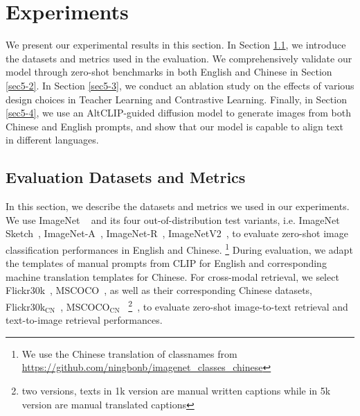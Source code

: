 \section{Experiments}
\label{sec5}
We present our experimental results in this section. In Section \ref{sec5-1}, we introduce the datasets and metrics used in the evaluation. We comprehensively validate our model through zero-shot benchmarks in both English and Chinese in Section \ref{sec5-2}.
In Section \ref{sec5-3}, we conduct an ablation study on the effects of various design choices in Teacher Learning and Contrastive Learning. 
Finally, in Section \ref{sec5-4}, we use an AltCLIP-guided diffusion model to generate images from both Chinese and English prompts, and show that our model is capable to align text in different languages.


\subsection{Evaluation Datasets and Metrics} 
\label{sec5-1}
In this section, we describe the datasets and metrics we used in our experiments. We use ImageNet ~\cite{deng2009imagenet} and its four out-of-distribution test variants, i.e. ImageNet Sketch~\cite{wang2019learning}, ImageNet-A~\cite{hendrycks2021natural}, ImageNet-R~\cite{hendrycks2021many}, ImageNetV2~\cite{recht2019imagenet}, to evaluate zero-shot image classification performances in English and Chinese. \footnote{We use the Chinese translation of classnames from \url{https://github.com/ningbonb/imagenet_classes_chinese}}
During evaluation, we adapt the templates of manual prompts from CLIP for English and corresponding machine translation templates for Chinese. For cross-modal retrieval, we select Flickr30k~\cite{young2014image}, MSCOCO~\cite{lin2014microsoft}, as well as their corresponding Chinese datasets, Flickr30k$_\text{CN}$~\cite{lan2017fluency}, MSCOCO$_\text{CN}$~ \footnote{two versions, texts in 1k version are manual written captions while in 5k version are manual translated captions}~\cite{li2019coco}, to evaluate zero-shot image-to-text retrieval and text-to-image retrieval performances. 

